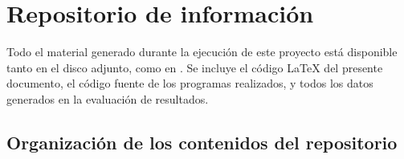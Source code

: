 

\section{Repositorio de información}
Todo el material generado durante la ejecución de este proyecto está disponible tanto en el disco adjunto, como en \thegitrepo{}. Se incluye el código \LaTeX{} del presente documento, el código fuente de los programas realizados, y todos los datos generados en la evaluación de resultados.

\subsection{Organización de los contenidos del repositorio}




